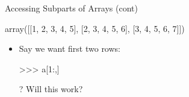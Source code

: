 \documentclass[aspectratio=169]{beamer}
\begin{document}
\begin{frame}[fragile]{Accessing Subparts of Arrays (cont)}

\begin{SQL}
array([[1, 2, 3, 4, 5],
       [2, 3, 4, 5, 6],
       [3, 4, 5, 6, 7]])
\end{SQL}

\begin{itemize}
\item Say we want first two rows:

\begin{SQL}
>>> a[1:,]
\end{SQL}

\item[?] Will this work?
\end{itemize}

\end{frame}
\end{document}

